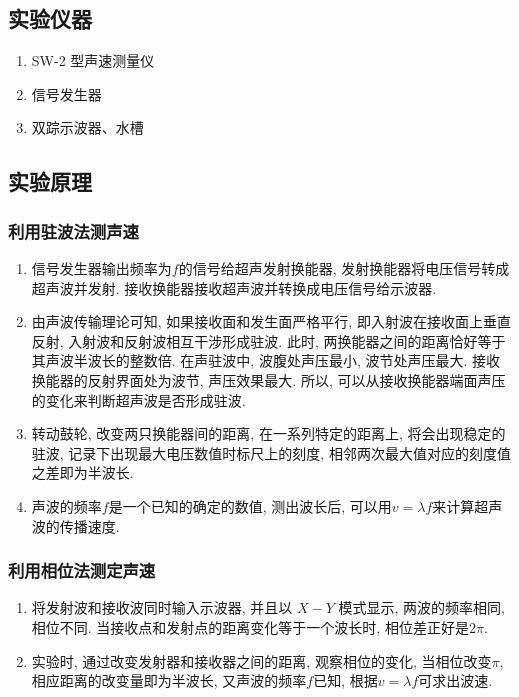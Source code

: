 \documentclass[zihao=5, UTF8]{article}
\theoremstyle{MyLineTheoremStyle} %
\theoremstyle{MyBlockTheoremStyle} %
\theoremstyle{MySubsubsectionStyle} %
\begin{document}
\subsection{实验仪器}
\begin{enumerate}
    \item SW-2 型声速测量仪
    \item 信号发生器
    \item 双踪示波器、水槽
\end{enumerate}
\subsection{实验原理}
\subsubsection{利用驻波法测声速}
\begin{enumerate}
    \item 信号发生器输出频率为$f$的信号给超声发射换能器, 发射换能器将电压信号转成超声波并发射. 接收换能器接收超声波并转换成电压信号给示波器. 
    \item 由声波传输理论可知, 如果接收面和发生面严格平行, 即入射波在接收面上垂直反射, 入射波和反射波相互干涉形成驻波. 此时, 两换能器之间的距离恰好等于其声波半波长的整数倍. 在声驻波中, 波腹处声压最小, 波节处声压最大. 接收换能器的反射界面处为波节, 声压效果最大. 所以, 可以从接收换能器端面声压的变化来判断超声波是否形成驻波. 
    \item 转动鼓轮, 改变两只换能器间的距离, 在一系列特定的距离上, 将会出现稳定的驻波, 记录下出现最大电压数值时标尺上的刻度, 相邻两次最大值对应的刻度值之差即为半波长. 
    \item 声波的频率$f$是一个已知的确定的数值, 测出波长后, 可以用$v = \lambda f$来计算超声波的传播速度. 
\end{enumerate}

\subsubsection{利用相位法测定声速}
\begin{enumerate}
    \item 将发射波和接收波同时输入示波器, 并且以 $X-Y$ 模式显示, 两波的频率相同, 相位不同. 当接收点和发射点的距离变化等于一个波长时, 相位差正好是$2\pi$. 
    \item 实验时, 通过改变发射器和接收器之间的距离, 观察相位的变化, 当相位改变$\pi$, 相应距离的改变量即为半波长, 又声波的频率$f$已知, 根据$v = \lambda f$可求出波速. 
\end{enumerate}
\end{document}
